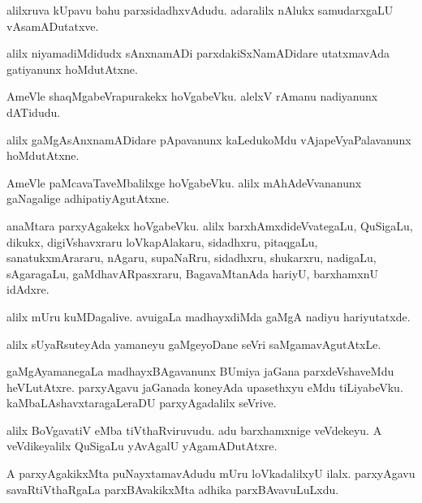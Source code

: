 \documentclass{article}
\begin{document}
\begin{mn}
alilxruva kUpavu bahu parxsidadhxvAdudu. adaralilx nAlukx samudarxgaLU vAsamADutatxve.
\end{mn}

\begin{mn}
alilx niyamadiMdidudx sAnxnamADi parxdakiSxNamADidare utatxmavAda gatiyanunx hoMdutAtxne.
\end{mn}

\begin{mn}
AmeVle shaqMgabeVrapurakekx hoVgabeVku. alelxV rAmanu nadiyanunx dATidudu.
\end{mn}

\begin{mn}
alilx gaMgAsAnxnamADidare pApavanunx kaLedukoMdu vAjapeVyaPalavanunx hoMdutAtxne.
\end{mn}

\begin{mn}
AmeVle paMcavaTaveMbalilxge hoVgabeVku. alilx mAhAdeVvananunx gaNagalige adhipatiyAgutAtxne.
\end{mn}

\begin{mn}
anaMtara parxyAgakekx hoVgabeVku. alilx barxhAmxdideVvategaLu, QuSigaLu, dikukx, digiVshavxraru 
loVkapAlakaru, sidadhxru, pitaqgaLu, sanatukxmArararu, nAgaru, supaNaRru, sidadhxru, shukarxru, 
nadigaLu, sAgaragaLu, gaMdhavARpasxraru, BagavaMtanAda hariyU, barxhamxnU idAdxre.
\end{mn}

\begin{mn}
alilx mUru kuMDagalive. avuigaLa madhayxdiMda gaMgA nadiyu hariyutatxde.
\end{mn}

\begin{mn}
alilx sUyaRsuteyAda yamaneyu gaMgeyoDane seVri saMgamavAgutAtxLe.
\end{mn}

\begin{mn}
gaMgAyamanegaLa madhayxBAgavanunx BUmiya jaGana parxdeVshaveMdu heVLutAtxre. parxyAgavu jaGanada 
koneyAda upasethxyu eMdu tiLiyabeVku. kaMbaLAshavxtaragaLeraDU parxyAgadalilx seVrive.
\end{mn}

\begin{mn}
alilx BoVgavatiV eMba tiVthaRviruvudu. adu barxhamxnige veVdekeyu. A veVdikeyalilx QuSigaLu 
yAvAgalU yAgamADutAtxre.
\end{mn}

\begin{mn}
A parxyAgakikxMta puNayxtamavAdudu mUru loVkadalilxyU ilalx. parxyAgavu savaRtiVthaRgaLa 
parxBAvakikxMta adhika parxBAvavuLuLxdu.
\end{mn}
\end{document}
